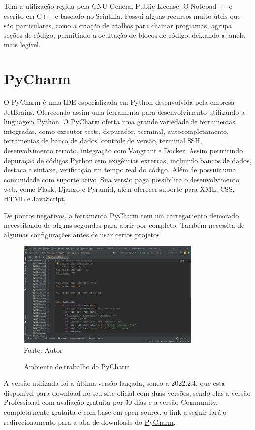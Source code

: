 	Tem a utilização regida pela GNU General Public License. O Notepad++ é escrito em C++ e baseado no Scintilla. Possui alguns recursos muito úteis que são particulares, como a criação de atalhos para chamar programas, agrupa seções de código, permitindo a ocultação de blocos de código, deixando a janela mais legível.
	
    \section{PyCharm}
    O PyCharm é uma IDE especializada em Python desenvolvida pela empresa JetBrains. Oferecendo assim uma ferramenta para desenvolvimento utilizando a linguagem Python. 
    O PyCharm oferta uma grande variedade de ferramentas integradas, como executor teste, depurador, terminal, autocompletamento, ferramentas de banco de dados, controle de versão, terminal SSH, desenvolvimento remoto, integração com Vangrant e Docker.
    Assim permitindo depuração de códigos Python sem exigências externas, incluindo bancos de dados, destaca a sintaxe, verificação em tempo real do código. Além de possuir uma comunidade com suporte ativo. Sua versão paga possibilita o desenvolvimento web, como Flask, Django e Pyramid, além oferecer suporte para XML, CSS, HTML e JavaScript.
    
    De pontos negativos, a ferramenta PyCharm tem um carregamento demorado, necessitando de alguns segundos para abrir por completo. Também necessita de algumas configurações antes de usar certos projetos.
    
    
    \begin{figure}[H]
    	\begin{center}
    		\caption{Ambiente de trabalho do PyCharm} \label{ling1}
    		\includegraphics[width=9cm]{pycharm.JPG} \\
    		{\tiny \sf Fonte:{ Autor}}
    	\end{center}
    \end{figure}
    
     A versão utilizada foi a última versão lançada, sendo a 2022.2.4, que está disponível para download no seu site oficial com duas versões, sendo elas a versão Professional com avaliação gratuita por 30 dias e a versão Community, completamente gratuita e com base em open source, o link a seguir fará o redirecionamento para a aba de downloads do \href{https://www.jetbrains.com/pt-br/pycharm/download/#section=windows}{PyCharm}.
    
